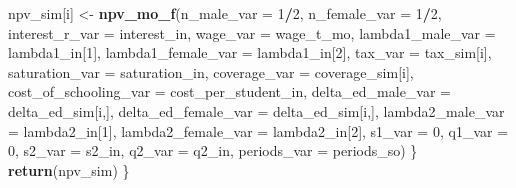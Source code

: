 \documentclass[]{article}
\newenvironment{Shaded}{\begin{snugshade}}{\end{snugshade}}
\newcommand{\DataTypeTok}[1]{\textcolor[rgb]{0.13,0.29,0.53}{#1}}
\newcommand{\DecValTok}[1]{\textcolor[rgb]{0.00,0.00,0.81}{#1}}
\newcommand{\KeywordTok}[1]{\textcolor[rgb]{0.13,0.29,0.53}{\textbf{#1}}}
\newcommand{\NormalTok}[1]{#1}
\newcommand{\OperatorTok}[1]{\textcolor[rgb]{0.81,0.36,0.00}{\textbf{#1}}}
\newcommand{\StringTok}[1]{\textcolor[rgb]{0.31,0.60,0.02}{#1}}
\begin{document}
\begin{Shaded}
\begin{Highlighting}[]
\NormalTok{          npv_sim[i] <-}\StringTok{ }\KeywordTok{npv_mo_f}\NormalTok{(}\DataTypeTok{n_male_var =} \DecValTok{1}\OperatorTok{/}\DecValTok{2}\NormalTok{, }\DataTypeTok{n_female_var =} \DecValTok{1}\OperatorTok{/}\DecValTok{2}\NormalTok{, }
                          \DataTypeTok{interest_r_var =}\NormalTok{ interest_in,}
                          \DataTypeTok{wage_var =}\NormalTok{ wage_t_mo,}
                          \DataTypeTok{lambda1_male_var =}\NormalTok{ lambda1_in[}\DecValTok{1}\NormalTok{],}
                          \DataTypeTok{lambda1_female_var =}\NormalTok{ lambda1_in[}\DecValTok{2}\NormalTok{], }
                          \DataTypeTok{tax_var =}\NormalTok{ tax_sim[i],}
                          \DataTypeTok{saturation_var =}\NormalTok{ saturation_in,             }
                          \DataTypeTok{coverage_var =}\NormalTok{ coverage_sim[i],}
                          \DataTypeTok{cost_of_schooling_var =}\NormalTok{ cost_per_student_in,}
                          \DataTypeTok{delta_ed_male_var =}\NormalTok{ delta_ed_sim[i,],}
                          \DataTypeTok{delta_ed_female_var =}\NormalTok{ delta_ed_sim[i,], }
                          \DataTypeTok{lambda2_male_var =}\NormalTok{ lambda2_in[}\DecValTok{1}\NormalTok{],}
                          \DataTypeTok{lambda2_female_var =}\NormalTok{ lambda2_in[}\DecValTok{2}\NormalTok{],}
                          \DataTypeTok{s1_var =} \DecValTok{0}\NormalTok{, }\DataTypeTok{q1_var =} \DecValTok{0}\NormalTok{, }\DataTypeTok{s2_var =}\NormalTok{ s2_in, }\DataTypeTok{q2_var =}\NormalTok{ q2_in,}
                          \DataTypeTok{periods_var =}\NormalTok{ periods_so)}
\NormalTok{      \}}
      \KeywordTok{return}\NormalTok{(npv_sim)}
\NormalTok{    \}}






\end{Highlighting}
\end{Shaded}
\end{document}
